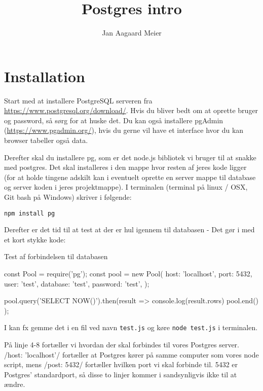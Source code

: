 \documentclass[english,course]{lecture}
\title{Postgres intro}
\author{Jan Aagaard Meier}
\begin{document}
\section{Installation}
Start med at installere PostgreSQL serveren fra \url{https://www.postgresql.org/download/}. Hvis du bliver bedt om at oprette bruger og password, så sørg for at huske det. Du kan også installere pgAdmin (\url{https://www.pgadmin.org/}), hvis du gerne vil have et interface hvor du kan browser tabeller også data.

Derefter skal du installere pg, som er det node.js bibliotek vi bruger til at snakke med postgres. Det skal installeres i den mappe hvor resten af jeres kode ligger (for at holde tingene adskilt kan i eventuelt oprette en server mappe til database og server koden i jeres projektmappe). I terminalen (terminal på linux / OSX, Git bash på Windows) skriver i følgende:

\begin{verbatim}
npm install pg
\end{verbatim}

Derefter er det tid til at test at der er hul igennem til databasen - Det gør i med et kort stykke kode: 

\begin{listing}[H]
\caption{Test af forbindelsen til databasen}
\label{lst:testconnection}
\begin{jscode}
const { Pool } = require('pg');
const pool = new Pool({
  host: 'localhost',
  port: 5432,
  user: 'test',
  database: 'test',
  password: 'test',
});

pool.query('SELECT NOW()').then(result => {
  console.log(result.rows)
  pool.end()
});
\end{jscode}
\end{listing}

I kan fx gemme det i en fil ved navn \texttt{test.js} og køre \texttt{node test.js} i terminalen.

På linje 4-8 fortæller vi hvordan der skal forbindes til vores Postgres server. \jsinline/host: 'localhost'/
 fortæller at Postgres kører på samme computer som vores node script, mens \jsinline/post: 5432/ fortæller hvilken port vi skal forbinde til. 5432 er Postgres' standardport, så disse to linjer kommer i sandsynligvis ikke til at ændre.

\end{document}
